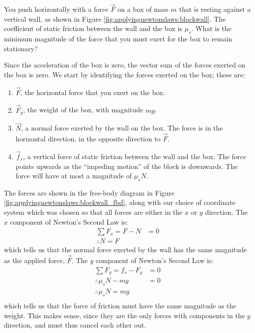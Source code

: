 \begin{example}{You push horizontally with a force $\vec F$ on a box of mass $m$ that is resting against a vertical wall, as shown in Figure \ref{fig:applyingnewtonslaws:blockwall}. The coefficient of static friction between the wall and the box is $\mu_s$. What is the minimum magnitude of the force that you must exert for the box to remain stationary?}

Since the acceleration of the box is zero, the vector sum of the forces exerted on the box is zero. We start by identifying the forces exerted on the box; these are:
\begin{enumerate}
\item $\vec F$, the horizontal force that you exert on the box.
\item $\vec F_g$, the weight of the box, with magnitude $mg$.
\item $\vec N$, a normal force exerted by the wall on the box. The force is in the horizontal direction, in the opposite direction to $\vec F$.
\item $\vec f_s$, a vertical force of static friction between the wall and the box. The force points upwards as the ``impeding motion'' of the block is downwards. The force will have at most a magnitude of $\mu_s N$.
\end{enumerate}
The forces are shown in the free-body diagram in Figure \ref{fig:applyingnewtonslaws:blockwall_fbd}, along with our choice of coordinate system which was chosen so that all forces are either in the $x$ or $y$ direction. 
The $x$ component of Newton's Second Law is:
\begin{align*}
\sum F_x = F - N &=0\\
\therefore N = F
\end{align*}
which tells us that the normal force exerted by the wall has the same magnitude as the applied force, $\vec F$. The $y$ component of Newton's Second Law is:
\begin{align*}
\sum F_y = f_s - F_g &=0\\
\therefore \mu_s N -mg &=0\\
\therefore \mu_s N = mg\\
\end{align*}
which tells us that the force of friction must have the same magnitude as the weight. This makes sense, since they are the only forces with components in the $y$ direction, and must thus cancel each other out. 


\end{example}
